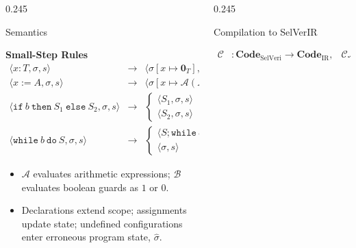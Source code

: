 \documentclass[final]{beamer}
\newcommand{\posterdensefont}{\fontsize{20}{25}\selectfont}
\begin{document}
\begin{frame}[t,fragile]
\begin{columns}[t,totalwidth=\textwidth]
\begin{column}{0.245\textwidth}
\begin{posterbox}[height=26.6cm,compactboxtitle]{Semantics}
{\vspace{0.18cm}
\begin{mathbox}[left=0.25cm,right=0.25cm,top=0.2cm,bottom=0.2cm]
\textbf{Small-Step Rules}
\[
\renewcommand{\arraystretch}{1.0}
\begin{array}{rcl}
\langle x:T,\sigma,s\rangle
&\to&
\langle \sigma[x\mapsto \mathbf{0}_T],\,s[x\mapsto T]\rangle \\
\langle x:=A,\sigma,s\rangle
&\to&
\langle \sigma[x\mapsto \mathcal{A}(A,\sigma,s,\iota)],\,s\rangle \\
\langle \mathtt{if}\ b\ \mathtt{then}\ S_1\ \mathtt{else}\ S_2,\sigma,s\rangle
&\to&
\begin{cases}
\langle S_1,\sigma,s\rangle & \mathcal{B}(b,\sigma,s)=1\\
\langle S_2,\sigma,s\rangle & \mathcal{B}(b,\sigma,s)=0
\end{cases} \\
\langle \mathtt{while}\ b\ \mathtt{do}\ S,\sigma,s\rangle
&\to&
\begin{cases}
\langle S;\mathtt{while}\ b\ \mathtt{do}\ S,\sigma,s\rangle
& \mathcal{B}(b,\sigma,s)=1\\
\langle \sigma,s\rangle
& \mathcal{B}(b,\sigma,s)=0
\end{cases}
\end{array}
\]
\end{mathbox}

\vspace{0.15cm}
\begin{itemize}
  \item $\mathcal{A}$ evaluates arithmetic expressions; $\mathcal{B}$ evaluates boolean guards as $1$ or $0$.
  \item Declarations extend scope; assignments update state; undefined configurations enter erroneous program state, $\hat{\sigma}$.
\end{itemize}
}
\end{posterbox}
\end{column}

\begin{column}{0.245\textwidth}

\begin{posterbox}[height=21.7cm,compactboxtitle]{Compilation to SelVerIR}
{\posterdensefont
\[
\begin{aligned}
\mathcal{C}&:\mathbf{Code}_{\text{SelVeri}}\to\mathbf{Code}_{\text{IR}},&
\mathcal{CA}&:\mathbf{AExp}\to\mathbf{Code}_{\text{IR}},&
\mathcal{CB}&:\mathbf{BExp}\to\mathbf{Code}_{\text{IR}}
\end{aligned}
\]

}
\end{posterbox}
\end{column}
\end{columns}
\end{frame}
\end{document}
